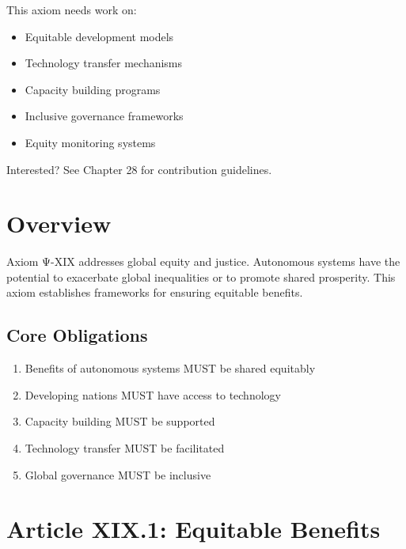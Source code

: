 \begin{tcolorbox}[colback=lightgray, colframe=accentgold, title=\textbf{🎯 Contribution Opportunity}]
This axiom needs work on:
\begin{itemize}
    \item Equitable development models
    \item Technology transfer mechanisms
    \item Capacity building programs
    \item Inclusive governance frameworks
    \item Equity monitoring systems
\end{itemize}

Interested? See Chapter 28 for contribution guidelines.
\end{tcolorbox}

\vspace{0.5cm}

\section{Overview}

Axiom Ψ-XIX addresses global equity and justice. Autonomous systems have the potential to exacerbate global inequalities or to promote shared prosperity. This axiom establishes frameworks for ensuring equitable benefits.

\subsection{Core Obligations}

\begin{enumerate}
    \item Benefits of autonomous systems MUST be shared equitably
    \item Developing nations MUST have access to technology
    \item Capacity building MUST be supported
    \item Technology transfer MUST be facilitated
    \item Global governance MUST be inclusive
\end{enumerate}

\vspace{0.5cm}

\section{Article XIX.1: Equitable Benefits}

